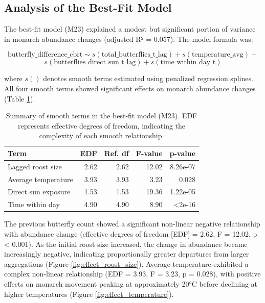 \subsection{Analysis of the Best-Fit Model}

The best-fit model (M23) explained a modest but significant portion of variance in monarch abundance changes (adjusted R² = 0.057). The model formula was:

\begin{equation}
\text{butterfly\_difference\_cbrt} \sim s(\text{total\_butterflies\_t\_lag}) + s(\text{temperature\_avg}) + 
\end{equation}
\begin{equation*}
s(\text{butterflies\_direct\_sun\_t\_lag}) + s(\text{time\_within\_day\_t})
\end{equation*}

where $s()$ denotes smooth terms estimated using penalized regression splines. All four smooth terms showed significant effects on monarch abundance changes (Table \ref{tab:smooth_terms}).

\begin{table}[htbp]
\centering
\caption{Summary of smooth terms in the best-fit model (M23). EDF represents effective degrees of freedom, indicating the complexity of each smooth relationship.}
\label{tab:smooth_terms}
\begin{tabular}{lrrrr}
\hline
Term & EDF & Ref. df & F-value & p-value \\
\hline
Lagged roost size & 2.62 & 2.62 & 12.02 & 8.26e-07 \\
Average temperature & 3.93 & 3.93 & 3.23 & 0.028 \\
Direct sun exposure & 1.53 & 1.53 & 19.36 & 1.22e-05 \\
Time within day & 4.90 & 4.90 & 8.90 & <2e-16 \\
\hline
\end{tabular}
\end{table}

The previous butterfly count showed a significant non-linear negative relationship with abundance change (effective degrees of freedom [EDF] = 2.62, F = 12.02, p < 0.001). As the initial roost size increased, the change in abundance became increasingly negative, indicating proportionally greater departures from larger aggregations (Figure \ref{fig:effect_roost_size}). Average temperature exhibited a complex non-linear relationship (EDF = 3.93, F = 3.23, p = 0.028), with positive effects on monarch movement peaking at approximately 20°C before declining at higher temperatures (Figure \ref{fig:effect_temperature}).

